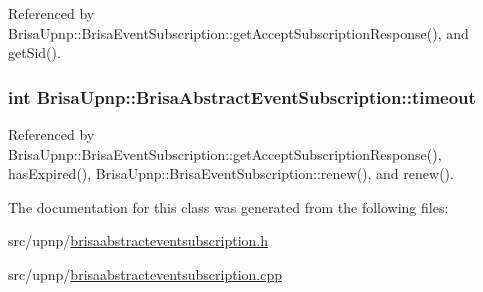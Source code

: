 Referenced by BrisaUpnp::BrisaEventSubscription::getAcceptSubscriptionResponse(), and getSid().\hypertarget{classBrisaUpnp_1_1BrisaAbstractEventSubscription_afb99d42e318e002acc44740a2ca7881a}{
\subsubsection[{timeout}]{\setlength{\rightskip}{0pt plus 5cm}int {\bf BrisaUpnp::BrisaAbstractEventSubscription::timeout}}}
\label{classBrisaUpnp_1_1BrisaAbstractEventSubscription_afb99d42e318e002acc44740a2ca7881a}


Referenced by BrisaUpnp::BrisaEventSubscription::getAcceptSubscriptionResponse(), hasExpired(), BrisaUpnp::BrisaEventSubscription::renew(), and renew().

The documentation for this class was generated from the following files:\begin{DoxyCompactItemize}
\item 
src/upnp/\hyperlink{brisaabstracteventsubscription_8h}{brisaabstracteventsubscription.h}\item 
src/upnp/\hyperlink{brisaabstracteventsubscription_8cpp}{brisaabstracteventsubscription.cpp}\end{DoxyCompactItemize}
